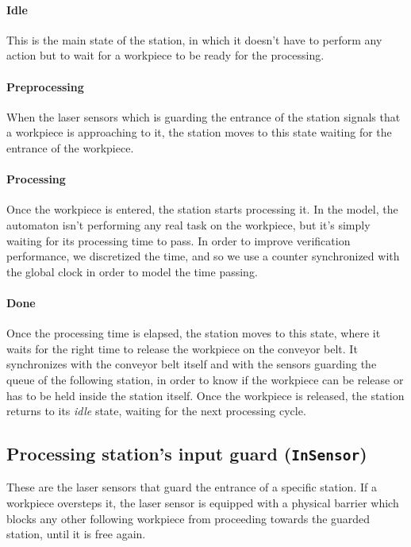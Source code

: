 \documentclass[a4paper]{article}
\begin{document}
    \paragraph{Idle} This is the main state of the station, in which it doesn't have to perform any action but to wait for a workpiece to be ready for the processing.

    \paragraph{Preprocessing} When the laser sensors which is guarding the entrance of the station signals that a workpiece is approaching to it, the station moves to this state waiting for the entrance of the workpiece.

    \paragraph{Processing} Once the workpiece is entered, the station starts processing it. In the model, the automaton isn't performing any real task on the workpiece, but it's simply waiting for its processing time to pass. In order to improve verification performance, we discretized the time, and so we use a counter synchronized with the global clock in order to model the time passing.

    \paragraph{Done} Once the processing time is elapsed, the station moves to this state, where it waits for the right time to release the workpiece on the conveyor belt. It synchronizes with the conveyor belt itself and with the sensors guarding the queue of the following station, in order to know if the workpiece can be release or has to be held inside the station itself. Once the workpiece is released, the station returns to its \textit{idle} state, waiting for the next processing cycle.

    \subsection{Processing station's input guard (\texttt{InSensor})}

    These are the laser sensors that guard the entrance of a specific station. If a workpiece oversteps it, the laser sensor is equipped with a physical barrier which blocks any other following workpiece from proceeding towards the guarded station, until it is free again.
\end{document}
